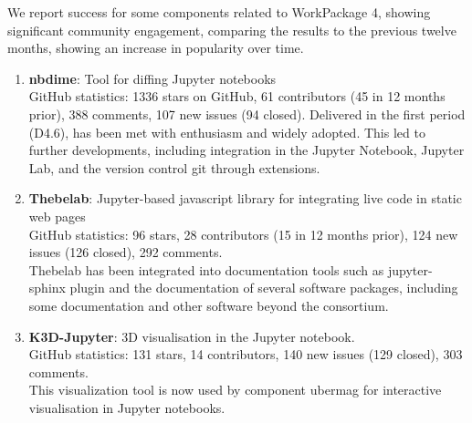 We report success for some \ODK components related to WorkPackage 4,
showing significant community engagement,
comparing the results to the previous twelve months,
showing an increase in popularity over time.

\begin{enumerate}
\item \textbf{nbdime}: Tool for diffing Jupyter notebooks\\
  GitHub statistics: 1336 stars on GitHub, 61 contributors (45 in 12
  months prior), 388 comments, 107 new issues (94 closed). Delivered
  in the first period (D4.6),  has been met with
  enthusiasm and widely adopted. This led to further developments,
  including integration in the Jupyter Notebook,
  Jupyter Lab, and the version control git through extensions.
\item \textbf{Thebelab}: Jupyter-based javascript library for integrating live code in static web pages\\
  GitHub statistics: 96 stars, 28 contributors (15 in 12 months prior), 124 new issues (126 closed), 292 comments.\\
  Thebelab has been integrated into documentation tools such as jupyter-sphinx plugin
  and the documentation of several software packages,
  including some \SageMath documentation and other software beyond the \ODK consortium.
\item \textbf{K3D-Jupyter}: 3D visualisation in the Jupyter notebook.\\
  GitHub statistics: 131 stars, 14 contributors, 140 new issues (129 closed), 303 comments. \\
  This visualization tool is now used by \ODK component ubermag
  for interactive visualisation in Jupyter notebooks.
\end{enumerate}


